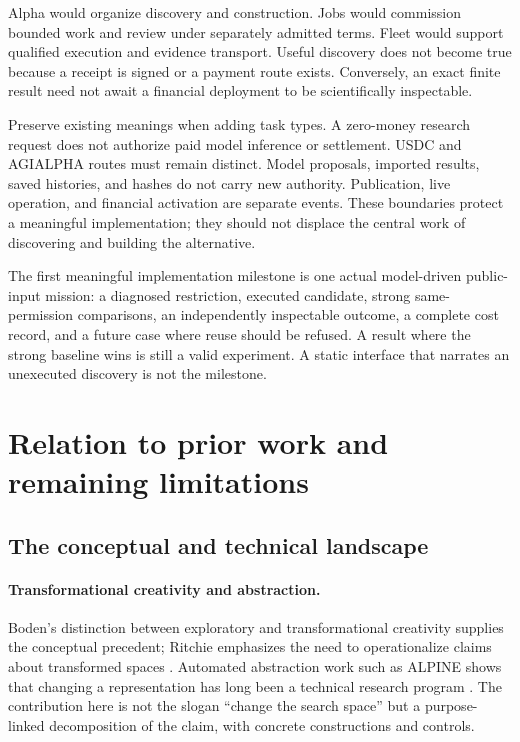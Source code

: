 \documentclass[11pt,letterpaper]{article}
\theoremstyle{remark}\newtheorem{remark}{Remark}[section]
\begin{document}
Alpha would organize discovery and construction. Jobs would commission bounded work and review under separately admitted terms. Fleet would support qualified execution and evidence transport. Useful discovery does not become true because a receipt is signed or a payment route exists. Conversely, an exact finite result need not await a financial deployment to be scientifically inspectable.

Preserve existing meanings when adding task types. A zero-money research request does not authorize paid model inference or settlement. USDC and AGIALPHA routes must remain distinct. Model proposals, imported results, saved histories, and hashes do not carry new authority. Publication, live operation, and financial activation are separate events. These boundaries protect a meaningful implementation; they should not displace the central work of discovering and building the alternative.

The first meaningful implementation milestone is one actual model-driven public-input mission: a diagnosed restriction, executed candidate, strong same-permission comparisons, an independently inspectable outcome, a complete cost record, and a future case where reuse should be refused. A result where the strong baseline wins is still a valid experiment. A static interface that narrates an unexecuted discovery is not the milestone.

\section{Relation to prior work and remaining limitations}
\subsection{The conceptual and technical landscape}
\paragraph{Transformational creativity and abstraction.}
Boden's distinction between exploratory and transformational creativity supplies the conceptual precedent; Ritchie emphasizes the need to operationalize claims about transformed spaces \citep{boden1998,ritchie2006}. Automated abstraction work such as ALPINE shows that changing a representation has long been a technical research program \citep{knoblock1994}. The contribution here is not the slogan ``change the search space'' but a purpose-linked decomposition of the claim, with concrete constructions and controls.
\end{document}
